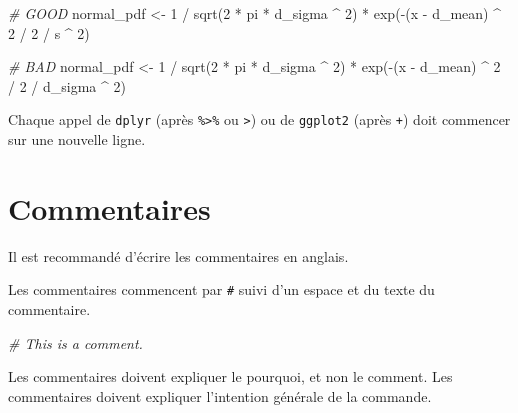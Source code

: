 \documentclass[
  french,
]{scrbook}
\newenvironment{Shaded}{\begin{snugshade}}{\end{snugshade}}
\newcommand{\CommentTok}[1]{\textcolor[rgb]{0.56,0.35,0.01}{\textit{#1}}}
\newcommand{\DecValTok}[1]{\textcolor[rgb]{0.00,0.00,0.81}{#1}}
\newcommand{\FunctionTok}[1]{\textcolor[rgb]{0.00,0.00,0.00}{#1}}
\newcommand{\NormalTok}[1]{#1}
\newcommand{\OtherTok}[1]{\textcolor[rgb]{0.56,0.35,0.01}{#1}}
\newcommand{\SpecialCharTok}[1]{\textcolor[rgb]{0.00,0.00,0.00}{#1}}
\begin{document}
\begin{Shaded}
\begin{Highlighting}[]
\CommentTok{\# GOOD }
\NormalTok{normal\_pdf }\OtherTok{\textless{}{-}} \DecValTok{1} \SpecialCharTok{/} \FunctionTok{sqrt}\NormalTok{(}\DecValTok{2} \SpecialCharTok{*}\NormalTok{ pi }\SpecialCharTok{*}\NormalTok{ d\_sigma }\SpecialCharTok{\^{}} \DecValTok{2}\NormalTok{) }\SpecialCharTok{*}
  \FunctionTok{exp}\NormalTok{(}\SpecialCharTok{{-}}\NormalTok{(x }\SpecialCharTok{{-}}\NormalTok{ d\_mean) }\SpecialCharTok{\^{}} \DecValTok{2} \SpecialCharTok{/} \DecValTok{2} \SpecialCharTok{/}\NormalTok{ s }\SpecialCharTok{\^{}} \DecValTok{2}\NormalTok{)}

\CommentTok{\# BAD}
\NormalTok{normal\_pdf }\OtherTok{\textless{}{-}} \DecValTok{1} \SpecialCharTok{/} \FunctionTok{sqrt}\NormalTok{(}\DecValTok{2} \SpecialCharTok{*}\NormalTok{ pi }\SpecialCharTok{*}\NormalTok{ d\_sigma }\SpecialCharTok{\^{}} \DecValTok{2}\NormalTok{)}
\SpecialCharTok{*} \FunctionTok{exp}\NormalTok{(}\SpecialCharTok{{-}}\NormalTok{(x }\SpecialCharTok{{-}}\NormalTok{ d\_mean) }\SpecialCharTok{\^{}} \DecValTok{2} \SpecialCharTok{/} \DecValTok{2} \SpecialCharTok{/}\NormalTok{ d\_sigma }\SpecialCharTok{\^{}} \DecValTok{2}\NormalTok{)}
\end{Highlighting}
\end{Shaded}

Chaque appel de \texttt{dplyr} (après \texttt{\%\textgreater{}\%} ou \texttt{\textbar{}\textgreater{}}) ou de \texttt{ggplot2} (après \texttt{+}) doit commencer sur une nouvelle ligne.

\hypertarget{commentaires}{%
\section{Commentaires}\label{commentaires}}

Il est recommandé d'écrire les commentaires en anglais.

Les commentaires commencent par \texttt{\#} suivi d'un espace et du texte du commentaire.

\begin{Shaded}
\begin{Highlighting}[]
\CommentTok{\# This is a comment.}
\end{Highlighting}
\end{Shaded}

Les commentaires doivent expliquer le pourquoi, et non le comment. Les commentaires doivent expliquer l'intention générale de la commande.
\end{document}
